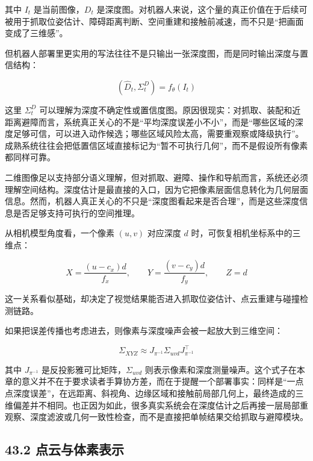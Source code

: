 其中 \(I_t\) 是当前图像，\(D_t\) 是深度图。对机器人来说，这个量的真正价值在于后续可被用于抓取位姿估计、障碍距离判断、空间重建和接触前减速，而不只是“把画面变成了三维感”。

但机器人部署里更实用的写法往往不是只输出一张深度图，而是同时输出深度与置信结构：

\begin{equation*}
(\hat{D}_t, \Sigma_t^{D}) = f_\theta(I_t)
\end{equation*}

这里 \(\Sigma_t^{D}\) 可以理解为深度不确定性或置信度图。原因很现实：对抓取、装配和近距离避障而言，系统真正关心的不是“平均深度误差小不小”，而是“哪些区域的深度足够可信，可以进入动作候选；哪些区域风险太高，需要重观察或降级执行”。成熟系统往往会把低置信区域直接标记为“暂不可执行几何”，而不是假设所有像素都同样可靠。

二维图像足以支持部分语义理解，但对抓取、避障、操作和导航而言，系统还必须理解空间结构。深度估计是最直接的入口，因为它把像素层面信息转化为几何层面信息。然而，机器人真正关心的不只是“深度图看起来是否合理”，而是这些深度信息是否足够支持可执行的空间推理。

从相机模型角度看，一个像素 \((u,v)\) 对应深度 \(d\) 时，可恢复相机坐标系中的三维点：

\begingroup
\footnotesize
\begin{equation*}
X = \frac{(u-c_x)d}{f_x}, \qquad
Y = \frac{(v-c_y)d}{f_y}, \qquad
Z = d
\end{equation*}
\endgroup

这一关系看似基础，却决定了视觉结果能否进入抓取位姿估计、点云重建与碰撞检测链路。

如果把误差传播也考虑进去，则像素与深度噪声会被一起放大到三维空间：

\begingroup
\footnotesize
\begin{equation*}
\Sigma_{XYZ} \approx J_{\pi^{-1}} \Sigma_{uvd} J_{\pi^{-1}}^\top
\end{equation*}
\endgroup

其中 \(J_{\pi^{-1}}\) 是反投影雅可比矩阵，\(\Sigma_{uvd}\) 则表示像素和深度测量噪声。这个式子在本章的意义并不在于要求读者手算协方差，而在于提醒一个部署事实：同样是“一点点深度误差”，在远距离、斜视角、边缘区域和接触前局部几何上，最终造成的三维偏差并不相同。也正因为如此，很多真实系统会在深度估计之后再接一层局部重观察、深度滤波或几何一致性检查，而不是直接把单帧结果交给抓取与避障模块。

\subsection*{43.2 点云与体素表示}


